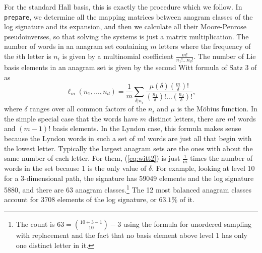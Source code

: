 For the standard Hall basis, this is exactly the procedure which we follow. In \verb|prepare|, we determine all the mapping matrices between anagram classes of the log signature and its expansion, and then we calculate all their Moore-Penrose pseudoinverses, so that solving the systems is just a matrix multiplication. 
The number of words in an anagram set containing $m$ letters where the frequency of the $i$th letter is $n_i$ is %
given by a multinomial coefficient $\frac{m!}{n_1!\dots n_d!}$. The number of Lie basis elements in an anagram set is given by the second Witt formula of Satz 3 of \cite{witt} as
\def\dummycommonfactor{\delta}
\def\lyn#1#2{\ensuremath{{\ell_{#1}}{\left(#2\right)}}}
\begin{equation}\label{eq:witt2}\lyn{m}{n_1,\dots,n_d}=\frac1m\sum_{\dummycommonfactor|n_i}\frac{\mu(\dummycommonfactor) (\frac{m}{\dummycommonfactor})!}{(\frac{n_1}{\dummycommonfactor})!\dots(\frac{n_d}{\dummycommonfactor})!},
\end{equation} where $\dummycommonfactor$ ranges over all common factors of the $n_i$ and $\mu$ is the M\"obius function. In the simple special case that the words have $m$ distinct letters, there are $m!$ words and $(m-1)!$ basis elements. In the Lyndon case, this formula makes sense because the Lyndon words in such a set of $m!$ words are just all that begin with the lowest letter. Typically the largest anagram sets are the ones with about the same number of each letter. For them, (\ref{eq:witt2}) is just $\frac1m$ times the number of words in the set because 1 is the only value of $\dummycommonfactor$. For example, looking at level 10 for a 3-dimensional path, the signature has 59049 elements and the log signature 5880, and there are 63 anagram classes.\footnote{The count is $63=\binom{10+3-1}{10}-3$ using the formula for unordered sampling with replacement and the fact that no basis element above level 1 has only one distinct letter in it.} The 12 most balanced anagram classes account for 3708 elements of the log signature, or $63.1\%$ of it. 

